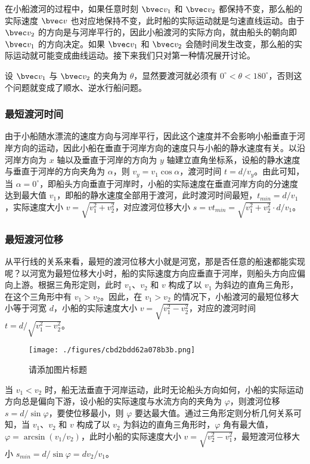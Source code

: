 在小船渡河的过程中，如果任意时刻 $\bvec v_1$ 和 $\bvec v_2$ 都保持不变，那么船的实际速度 $\bvec v$ 也对应地保持不变，此时船的实际运动就是匀速直线运动。由于 $\bvec v_2$ 的方向是与河岸平行的，因此小船渡河的实际方向，就由船头的朝向即 $\bvec v_1$ 的方向决定。如果 $\bvec v_1$ 和 $\bvec v_2$ 会随时间发生改变，那么船的实际运动就可能变成曲线运动。接下来我们只对第一种情况展开讨论。

设 $\bvec v_1$ 与 $\bvec v_2$ 的夹角为 $\theta$，显然要渡河就必须有 $0^\circ < \theta < 180^\circ $，否则这个问题就变成了顺水、逆水行船问题。

\subsubsection{最短渡河时间}

由于小船随水漂流的速度方向与河岸平行，因此这个速度并不会影响小船垂直于河岸方向的运动，因此小船在垂直于河岸方向的速度只与小船的静水速度有关。以沿河岸方向为 $x$ 轴以及垂直于河岸的方向为 $y$ 轴建立直角坐标系，设船的静水速度与垂直于河岸的方向夹角为 $\alpha$，则 $v_y = v_1 \cos \alpha$，渡河时间 $t=d/v_y$。由此可知，当 $\alpha = 0^\circ$，即船头方向垂直于河岸时，小船的实际速度在垂直河岸方向的分速度达到最大值 $v_1$，即船的静水速度全部用于渡河，此时渡河时间最短，$t_{min}=d/v_1$，实际速度大小 $v=\sqrt{v_1^2+v_2^2}$，对应渡河位移大小 $s=vt_{min}=\sqrt{v_1^2+v_2^2}\cdot d/v_1$。

\subsubsection{最短渡河位移}

从平行线的关系来看，最短的渡河位移大小就是河宽，那是否任意的船速都能实现呢？以河宽为最短位移大小时，船的实际速度方向应垂直于河岸，则船头方向应偏向上游。根据三角形定则，此时 $v_1$、$v_2$ 和 $v$ 构成了以 $v_1$ 为斜边的直角三角形，在这个三角形中有 $v_1>v_2$。因此，在 $v_1>v_2$ 的情况下，小船渡河的最短位移大小等于河宽 $d$，小船的实际速度大小 $v=\sqrt{v_1^2-v_2^2}$，对应的渡河时间 $t=d/\sqrt{v_1^2-v_2^2}$。

\begin{figure}[ht]
\centering
\texttt{[image: ./figures/cbd2bdd62a078b3b.png]}
\caption{请添加图片标题} \label{fig_HSPM04_1}
\end{figure}


当 $v_1<v_2$ 时，船无法垂直于河岸运动，此时无论船头方向如何，小船的实际运动方向总是偏向下游，设小船的实际速度与水流方向的夹角为 $\varphi$，则渡河位移 $s = d/\sin \varphi$，要使位移最小，则 $\varphi$ 要达最大值。通过三角形定则分析几何关系可知，当 $v_1$、$v_2$ 和 $v$ 构成了以 $v_2$ 为斜边的直角三角形时，$\varphi$ 角有最大值，$\varphi=\arcsin(v_1/v_2)$，此时小船的实际速度大小 $v=\sqrt{v_2^2-v_1^2}$，最短渡河位移大小 $s_{min} = d/\sin \varphi=dv_2/v_1$。

